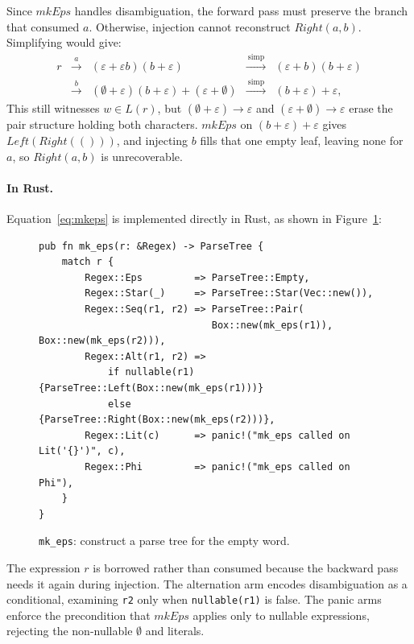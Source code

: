 Since $\mathit{mkEps}$ handles disambiguation, 
the forward pass must preserve the branch that consumed $a$.
Otherwise, injection cannot reconstruct $\mathit{Right}(a,b)$. 
Simplifying would give:
\begin{equation}\label{eq:mkeps-simp}
\begin{aligned}
r
  &\xrightarrow{\ a\ } & (\varepsilon + \varepsilon b)(b + \varepsilon)
  &\xrightarrow{\ \mathrm{simp}\ } & (\varepsilon + b)(b + \varepsilon) \\
  &\xrightarrow{\ b\ } & (\emptyset + \varepsilon)(b+\varepsilon) + (\varepsilon + \emptyset)
  &\xrightarrow{\ \mathrm{simp}\ } & (b + \varepsilon) + \varepsilon,
\end{aligned}
\end{equation}
This still witnesses $w \in L(r)$, 
but $(\emptyset + \varepsilon) \to \varepsilon$ 
and $(\varepsilon + \emptyset) \to \varepsilon$ 
erase the pair structure holding both characters. 
$\mathit{mkEps}$ on $(b+\varepsilon)+\varepsilon$ 
gives $\mathit{Left}(\mathit{Right}(()))$,
and injecting $b$ fills that one empty leaf, 
leaving none for $a$, so $\mathit{Right}(a,b)$ is unrecoverable.

%

\paragraph{In Rust.}
\label{sec:mk-eps-impl}

Equation~\eqref{eq:mkeps} is implemented directly in Rust, 
as shown in Figure~\ref{fig:mkeps-rust}:
\begin{figure}[H]
\small
\begin{verbatim}
pub fn mk_eps(r: &Regex) -> ParseTree {
    match r {
        Regex::Eps         => ParseTree::Empty,
        Regex::Star(_)     => ParseTree::Star(Vec::new()),
        Regex::Seq(r1, r2) => ParseTree::Pair(
                              Box::new(mk_eps(r1)), Box::new(mk_eps(r2))),
        Regex::Alt(r1, r2) => 
            if nullable(r1)   {ParseTree::Left(Box::new(mk_eps(r1)))} 
            else              {ParseTree::Right(Box::new(mk_eps(r2)))},
        Regex::Lit(c)      => panic!("mk_eps called on Lit('{}')", c),
        Regex::Phi         => panic!("mk_eps called on Phi"),
    }
}
\end{verbatim}
\caption{\texttt{mk\_eps}: construct a parse tree for the empty word.}
\label{fig:mkeps-rust}
\end{figure}

The expression $r$ is borrowed rather than consumed 
because the backward pass needs it again during injection. 
The alternation arm encodes disambiguation as a conditional,
examining \texttt{r2} only when \texttt{nullable(r1)} is false. 
The panic arms enforce the precondition that $\mathit{mkEps}$ 
applies only to nullable expressions, 
rejecting the non-nullable $\emptyset$ and literals.

